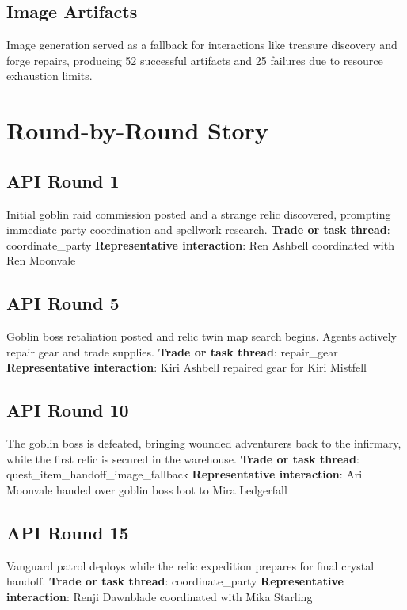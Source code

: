 \documentclass[11pt,a4paper]{article}
\begin{document}
\subsection{Image Artifacts}
Image generation served as a fallback for interactions like treasure discovery and forge repairs, producing 52 successful artifacts and 25 failures due to resource exhaustion limits.

\section{Round-by-Round Story}
\subsection{API Round 1}
Initial goblin raid commission posted and a strange relic discovered, prompting immediate party coordination and spellwork research.
\newline \textbf{Trade or task thread}: coordinate\_party
\newline \textbf{Representative interaction}: Ren Ashbell coordinated with Ren Moonvale

\subsection{API Round 5}
Goblin boss retaliation posted and relic twin map search begins. Agents actively repair gear and trade supplies.
\newline \textbf{Trade or task thread}: repair\_gear
\newline \textbf{Representative interaction}: Kiri Ashbell repaired gear for Kiri Mistfell

\subsection{API Round 10}
The goblin boss is defeated, bringing wounded adventurers back to the infirmary, while the first relic is secured in the warehouse.
\newline \textbf{Trade or task thread}: quest\_item\_handoff\_image\_fallback
\newline \textbf{Representative interaction}: Ari Moonvale handed over goblin boss loot to Mira Ledgerfall

\subsection{API Round 15}
Vanguard patrol deploys while the relic expedition prepares for final crystal handoff.
\newline \textbf{Trade or task thread}: coordinate\_party
\newline \textbf{Representative interaction}: Renji Dawnblade coordinated with Mika Starling
\end{document}

